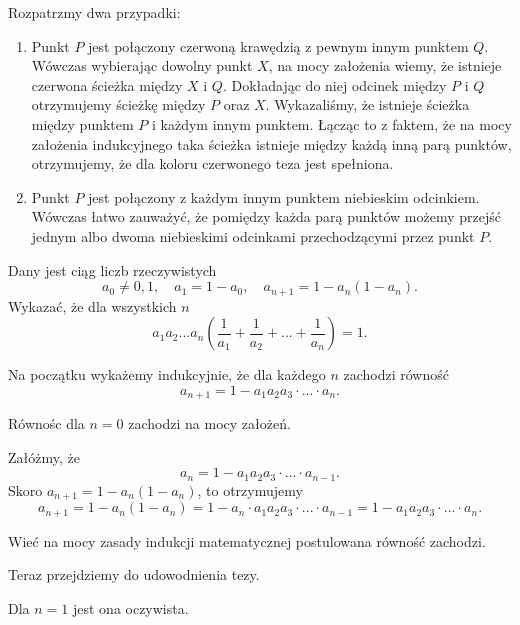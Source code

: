 Rozpatrzmy dwa przypadki:
\begin{enumerate}
	\item Punkt $P$ jest połączony czerwoną krawędzią z pewnym innym punktem $Q$. Wówczas wybierając dowolny punkt $X$, na mocy założenia wiemy, że istnieje czerwona ścieżka między $X$ i $Q$. Dokładając do niej odcinek między $P$ i $Q$ otrzymujemy ścieżkę między $P$ oraz $X$.
	Wykazaliśmy, że istnieje ścieżka między punktem $P$ i każdym innym punktem. Łącząc to z faktem, że na mocy założenia indukcyjnego taka ścieżka istnieje między każdą inną parą punktów, otrzymujemy, że dla koloru czerwonego teza jest spełniona.
	\item Punkt $P$ jest połączony z każdym innym punktem niebieskim odcinkiem. Wówczas łatwo zauważyć, że pomiędzy każda parą punktów możemy przejść jednym albo dwoma niebieskimi odcinkami przechodzącymi przez punkt $P$.
\end{enumerate}

\begin{problem}{5}
Dany jest ciąg liczb rzeczywistych
\[
	a_0 \neq 0, 1,\quad a_1 = 1 - a_0,\quad a_{n + 1} = 1 - a_n(1 - a_n). 
\]
Wykazać, że dla wszystkich $n$ 
\[
	a_1a_2...a_n\left(\frac{1}{a_1} + \frac{1}{a_2} + ... + \frac{1}{a_n}\right) = 1.
\]
\end{problem}

\noindent
Na początku wykażemy indukcyjnie, że dla każdego $n$ zachodzi równość
\[
	a_{n + 1} = 1 - a_1a_2a_3\cdot ... \cdot a_{n}.
\]

Równośc dla $n = 0$ zachodzi na mocy założeń.

Załóżmy, że
\[
	a_{n} = 1 - a_1a_2a_3\cdot ... \cdot a_{n - 1}.
\]
Skoro $a_{n + 1} = 1 - a_n(1 - a_n)$, to otrzymujemy
\[
	a_{n + 1} = 1 - a_n(1 - a_n) = 1 - a_n \cdot a_1a_2a_3\cdot ... \cdot a_{n - 1} = 1 - a_1a_2a_3\cdot ... \cdot a_{n}.
\]

Wieć na mocy zasady indukcji matematycznej postulowana równość zachodzi.

Teraz przejdziemy do udowodnienia tezy.

Dla $n = 1$ jest ona oczywista.

